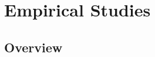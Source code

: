 \documentclass[conference]{IEEEtran}
\newcommand{\birth}[1]{\mathcal{C}(#1)}
\begin{document}
% 
% 
% 
% 
% 
% 
% 

\section{Empirical Studies}\label{sect:studies}

\subsection{Overview}\label{sect:study_overview}
\end{document}
